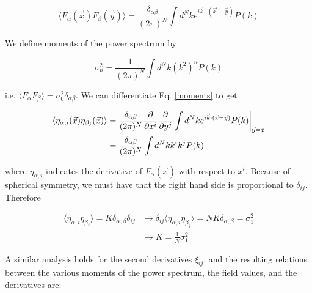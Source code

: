 \documentclass[12pt]{article}
\begin{document}
\begin{equation}
\langle F_\alpha(\vec{x}) F_\beta(\vec{y}) \rangle = \frac{\delta_{\alpha\beta}}{(2\pi)^N} \int d^Nk e^{i \vec{k} \cdot (\vec{x}-\vec{y})} P(k)
\end{equation}

We define moments of the power spectrum by

\begin{equation} \label{moments}
\sigma_n^2 = \frac{1}{(2\pi)^N}\int d^Nk (k^{2})^n P(k)
\end{equation}

\noindent i.e. $\langle F_\alpha F_\beta \rangle = \sigma_0^2\delta_{\alpha\beta}$. We can differentiate Eq. \ref{moments} to get

\begin{align*}
\langle \eta_{\alpha,i}(\vec{x})\eta_{\beta_j}(\vec{x})\rangle &= \frac{\delta_{\alpha\beta}}{(2\pi)^N} \frac{\partial}{\partial x^i}\frac{\partial}{\partial y^j} \int d^Nk e^{i \vec{k} \cdot (\vec{x}-\vec{y})} P(k)\bigg{|}_{\vec{y}=\vec{x}}\\
&= \frac{\delta_{\alpha\beta}}{(2\pi)^N}\int d^Nk k^i k^j P(k)
\end{align*}

\noindent where $\eta_{\alpha, i}$ indicates the derivative of $F_\alpha(\vec{x})$ with respect to $x^i$. Because of spherical symmetry, we must have that the right hand side is proportional to $\delta_{ij}$. Therefore

\begin{align*}
\langle \eta_{\alpha,i}\eta_{\beta_j}\rangle = K \delta_{\alpha,\beta}\delta_{ij} &\rightarrow \delta_{ij}\langle \eta_{\alpha,i}\eta_{\beta_j}\rangle = NK \delta_{\alpha,\beta}=\sigma_1^2\\
&\rightarrow K = \frac{1}{N}\sigma_1^2
\end{align*}

\noindent A similar analysis holds for the second derivatives $\xi_{ij}$, and the resulting relations between the various moments of the power spectrum, the field values, and the derivatives are:

\end{document}
